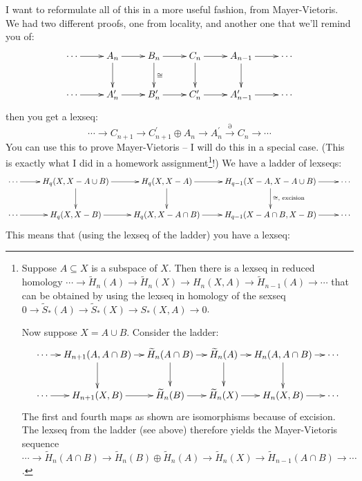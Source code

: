 \documentclass{amsart}
\theoremstyle{theorem}
\theoremstyle{definition}
\begin{document}
I want to reformulate all of this in a more useful fashion, from Mayer-Vietoris. We had two different proofs, one from locality, and another one that we'll remind you of:
\begin{equation*}
\xymatrix{
	\cdots\ar[r] & A_n\ar[r]\ar[d] & B_n\ar[r]\ar[d]^\cong & C_n\ar[r]\ar[d] & A_{n-1}\ar[r]\ar[d] & \cdots\\
	\cdots\ar[r] & A_n^\prime\ar[r] & B_n^\prime\ar[r] & C^\prime_n\ar[r] & A^\prime_{n-1}\ar[r] & \cdots
}
\end{equation*}
then you get a lexseq:
\begin{equation*}
\cdots\to C_{n+1}\to C^\prime_{n+1}\oplus A_n\to A^\prime_n\xrightarrow{\partial} C_n\to\cdots
\end{equation*}
You can use this to prove Mayer-Vietoris -- I will do this in a special case. (This is exactly what I did in a homework assignment\footnote{Suppose $A\subseteq X$ is a subspace of $X$. Then there is a lexseq in reduced homology $\cdots\to \widetilde{ H}_n(A)\to \widetilde{ H}_n(X)\to H_n(X,A)\to\widetilde{ H}_{n-1}(A)\to\cdots$ that can be obtained by using the lexseq in homology of the sexseq $0\to\widetilde{S}_\ast(A)\to\widetilde{S}_\ast(X)\to S_\ast(X,A)\to 0$.

Now suppose $X=A\cup B$. Consider the ladder:
\begin{equation*}
\xymatrix@C=10pt{\cdots\ar[r] & H_{n+1}(A,A\cap B)\ar[r]\ar[d] & \widetilde{ H}_n(A\cap B)\ar[r]\ar[d] & \widetilde{ H}_n(A)\ar[r]\ar[d] & H_n(A,A\cap B)\ar[r]\ar[d] & \cdots\\
\cdots\ar[r] & H_{n+1}(X,B)\ar[r] & \widetilde{ H}_n(B)\ar[r] & \widetilde{ H}_n(X)\ar[r] & H_n(X,B)\ar[r] & \cdots}
\end{equation*}
The first and fourth maps as shown are isomorphisms because of excision. The lexseq from the ladder (see above) therefore yields the Mayer-Vietoris sequence $\cdots\to \widetilde{ H}_n(A\cap B)\to \widetilde{ H}_n(B)\oplus \widetilde{ H}_n(A)\to \widetilde{ H}_n(X)\to \widetilde{ H}_{n-1}(A\cap B)\to\cdots$.}!) We have a ladder of lexseqs:
\begin{equation*}
\xymatrix{
	\cdots\ar[r] & H_q(X,X-A\cup B)\ar[r]\ar[d] & H_q(X,X-A)\ar[r]\ar[d] & H_{q-1}(X-A,X-A\cup B)\ar[r]\ar[d]^{\cong,\text{ excision}} & \cdots\\
	\cdots\ar[r] & H_q(X,X-B)\ar[r] & H_q(X,X-A\cap B)\ar[r] & H_{q-1}(X-A\cap B,X-B)\ar[r] & \cdots
}
\end{equation*}
This means that (using the lexseq of the ladder) you have a lexseq:
\end{document}
